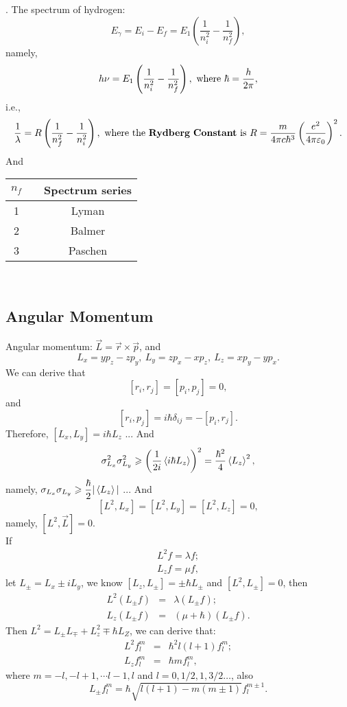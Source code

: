 \documentclass[12pt, 
]{article}
\begin{document}
. The spectrum of hydrogen:
\[
	E_\gamma=E_i-E_f=E_1\left(\frac{1}{n_i^2}-\frac{1}{n_f^2}\right),
\]
namely,
\[
	h\nu=E_1\left(\frac{1}{n_i^2}-\frac{1}{n_f^2}\right), ~{\rm where}~\hbar=\frac{h}{2\pi},
\]
i.e.,
\[
	\frac{1}{\lambda}=R\left(\frac{1}{n_f^2}-\frac{1}{n_i^2}\right),~{\rm where~the~{\bf Rydberg~Constant}~is}~R=\frac{m}{4\pi c\hbar^3}\left(\frac{e^2}{4\pi\varepsilon_0}\right)^2.
\]
And 
\begin{table}[h]
	\centering
	\begin{tabular}{ccc}
	\hline\hline
		$n_f$&&Spectrum series\\
	\hline
		1&&Lyman\\
		2&&Balmer\\
		3&&Paschen\\
	\hline\hline
	\end{tabular}
\end{table}
~\\

\subsection{Angular Momentum}
Angular momentum: $\vec{L}=\vec{r}\times\vec{p}$, and 
\[
	L_x=yp_z-zp_y,~L_y=zp_x-xp_z,~L_z=xp_y-yp_x.
\]
We can derive that
\[
	[r_i,r_j]=[p_i,p_j]=0,
\]
and \[
	[r_i, p_j]=i\hbar\delta_{ij}=-[p_i,r_j].	
\]
Therefore, $[L_x, L_y]=i\hbar L_z$ ...
And
\[
	\sigma_{L_x}^2\sigma_{L_y}^2\geqslant\left(\frac{1}{2i}\braket{i\hbar L_z}\right)^2=\frac{\hbar^2}{4}\braket{L_z}^2,
\]
namely, $\sigma_{L_x}\sigma_{L_y}\geqslant\dfrac{\hbar}{2}|\braket{L_z}|$ ...
And \[
	[L^2,L_x]=[L^2,L_y]=[L^2,L_z]=0,
\]
namely, $[L^2,\vec{L}]=0$.\\
If 
\begin{eqnarray*}
	L^2f=\lambda f;\\
	L_zf=\mu f,
\end{eqnarray*}
let $L_\pm=L_x\pm iL_y$, we know $[L_z,L_\pm]=\pm\hbar L_\pm$ and $[L^2, L_\pm]=0$, then
\begin{eqnarray*}
	L^2(L_\pm f)&=&\lambda(L_\pm f);\\
	L_z(L_\pm f)&=&(\mu+\hbar)(L_\pm f).
\end{eqnarray*}
Then $L^2=L_\pm L_\mp +L_z^2\mp\hbar L_Z$, we can derive that:
\begin{eqnarray*}
	L^2f_l^m&=&\hbar^2l(l+1)f_l^m;\\
	L_zf_l^m&=&\hbar mf_l^m,
\end{eqnarray*}
where $m=-l, -l+1,\cdots l-1,l$ and $l=0,1/2,1,3/2\dots$, also
\begin{equation}\label{eq:22}
	L_\pm f_l^m=\hbar\sqrt{l(l+1)-m(m\pm1)}f_l^{m\pm 1}.
\end{equation}~\\
\end{document}
